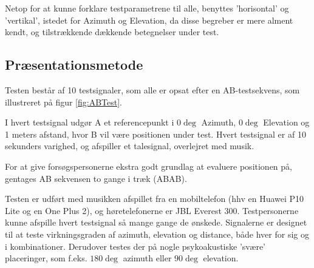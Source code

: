 Netop for at kunne forklare testparametrene til alle, benyttes 'horisontal' og 'vertikal', istedet for Azimuth og Elevation, da disse begreber er mere alment kendt, og tilstrækkende dækkende betegnelser under test. 

\subsection{Præsentationsmetode}

Testen består af 10 testsignaler, som alle er opsat efter en AB-testsekvens, som illustreret på figur \ref{fig:ABTest}. 


I hvert testsignal udgør A et referencepunkt i $0\deg$ Azimuth, $0\deg$ Elevation og 1 meters afstand, hvor B vil være positionen under test. 
Hvert testsignal er af 10 sekunders varighed, og afspiller et talesignal, overlejret med musik. 

For at give forsøgspersonerne ekstra godt grundlag at evaluere positionen på, gentages AB sekvensen to gange i træk (ABAB). 

Testen er udført med musikken afspillet fra en mobiltelefon (hhv en Huawei P10 Lite og en One Plus 2), og høretelefonerne er JBL Everest 300. Testpersonerne kunne afspille hvert testsignal så mange gange de ønskede. Signalerne er designet til at teste virkningsgraden af azimuth, elevation og distance, både hver for sig og i kombinationer. Derudover testes der på nogle psykoakustiske 'svære' placeringer, som f.eks. $180\deg$ azimuth eller $90\deg$ elevation.  

